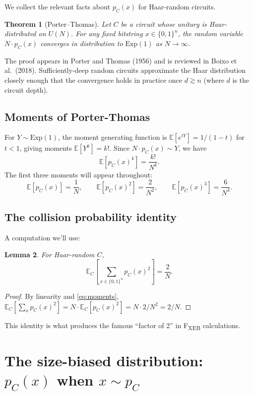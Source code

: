 \documentclass[11pt]{article}
\newtheorem{theorem}{Theorem}[section]
\newtheorem{lemma}[theorem]{Lemma}
\theoremstyle{definition}
\theoremstyle{remark}
\newcommand{\E}{\mathbb{E}}
\begin{document}
We collect the relevant facts about $p_C(x)$ for Haar-random circuits.

\begin{theorem}[Porter--Thomas]
\label{thm:pt}
Let $C$ be a circuit whose unitary is Haar-distributed on $U(N)$. For any
fixed bitstring $x \in \{0,1\}^n$, the random variable
$N \cdot p_C(x)$ converges in distribution to $\mathrm{Exp}(1)$ as
$N \to \infty$.
\end{theorem}

The proof appears in Porter and Thomas (1956) and is reviewed in
Boixo et al.\ (2018). Sufficiently-deep random circuits approximate the
Haar distribution closely enough that the convergence holds in practice
once $d \gtrsim n$ (where $d$ is the circuit depth).

\subsection{Moments of Porter-Thomas}

For $Y \sim \mathrm{Exp}(1)$, the moment generating function is
$\E[e^{tY}] = 1/(1-t)$ for $t < 1$, giving moments $\E[Y^k] = k!$. Since
$N \cdot p_C(x) \sim Y$, we have
\begin{equation}
  \E[p_C(x)^k] = \frac{k!}{N^k}.
  \label{eq:moments}
\end{equation}
The first three moments will appear throughout:
\[
  \E[p_C(x)] = \frac{1}{N}, \qquad
  \E[p_C(x)^2] = \frac{2}{N^2}, \qquad
  \E[p_C(x)^3] = \frac{6}{N^3}.
\]

\subsection{The collision probability identity}

A computation we'll use:
\begin{lemma}
\label{lem:collision}
For Haar-random $C$,
\[
  \E_C\!\left[\sum_{x \in \{0,1\}^n} p_C(x)^2 \right] = \frac{2}{N}.
\]
\end{lemma}

\begin{proof}
By linearity and \eqref{eq:moments}, $\E_C[\sum_x p_C(x)^2] = N \cdot
\E_C[p_C(x)^2] = N \cdot 2/N^2 = 2/N$. \qedhere
\end{proof}

This identity is what produces the famous ``factor of 2'' in F\textsubscript{XEB}
calculations.

\section{The size-biased distribution: $p_C(x)$ when $x \sim p_C$}
\label{sec:sizebias}
\end{document}
